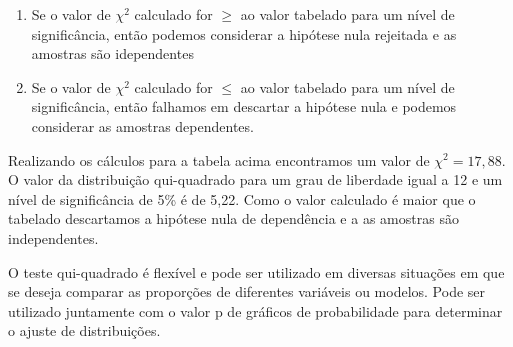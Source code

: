 \begin{enumerate}
	\item Se o valor de $\chi^2$ calculado for $\geq$ ao valor tabelado para um nível de significância, então podemos considerar a hipótese nula rejeitada e as amostras são idependentes
	\item Se o valor de $\chi^2$ calculado for $\leq$ ao valor tabelado para um nível de significância, então falhamos em descartar a hipótese nula e podemos considerar as amostras dependentes. 
\end{enumerate}

Realizando os cálculos para a tabela acima encontramos um valor de $\chi^2= 17,88$. O valor da distribuição qui-quadrado para um grau de liberdade igual a 12 e um nível de significância de 5\% é de 5,22. Como o valor calculado é maior que o tabelado descartamos a hipótese nula de dependência e a as amostras são independentes. 

O teste qui-quadrado é flexível e pode ser utilizado em diversas situações em que se deseja comparar as proporções de diferentes variáveis ou modelos. Pode ser utilizado juntamente com o valor p de gráficos de probabilidade para determinar o ajuste de distribuições. 